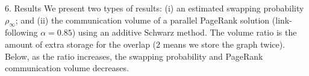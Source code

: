 \documentclass[final,hyperref={pdfpagelabels=true},t]{beamer}
\begin{document}
\begin{frame}
\begin{columns}
\begin{block}{6. Results}
We present two types of results: (i)  an
 estimated swapping probability $\rho_{\infty}$; 
 and (ii) the communication volume of a parallel PageRank
solution (link-following $\alpha=0.85$) using an 
additive Schwarz method.  The volume ratio is the amount of
extra storage for the overlap (2 means we store the graph twice).
Below, as the ratio increases, the swapping
probability and PageRank communication volume decreases.

\begin{center}
\footnotesize
{}
\end{center}




\end{block}
\end{columns}
\end{frame}
\end{document}
